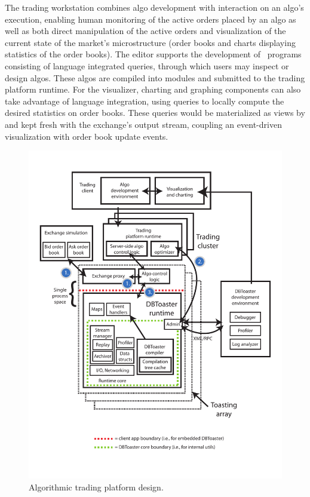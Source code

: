 The trading workstation combines algo development with interaction on an algo's
execution, enabling human monitoring of the active orders placed by an algo as
well as both direct manipulation of the active orders and visualization of the
current state of the market's microstructure (order books and charts displaying
statistics of the order books). The editor supports the development of
\targetlang\ programs consisting of language integrated queries, through which
users may inspect or design algos. These algos are compiled into modules and
submitted to the trading platform runtime. For the visualizer, charting and
graphing components can also take advantage of language integration, using
queries to locally compute the desired statistics on order books. These queries
would be materialized as views by \compiler and kept fresh with the exchange's
output stream, coupling an event-driven visualization with order book update
events.

\begin{figure}[htbp]
\begin{center}
\vspace{-5mm}
\includegraphics[scale=0.33]{figures/finapp}
\end{center}
\label{fig:algarch}
\vspace{-10mm}
\caption{Algorithmic trading platform design.}
\end{figure}


